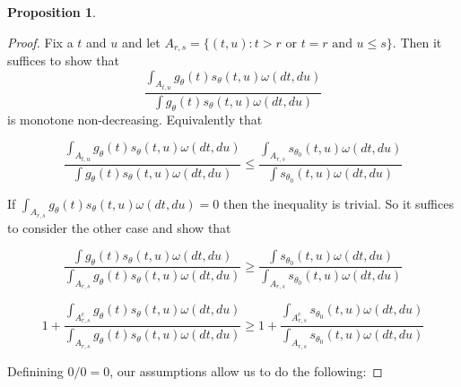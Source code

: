 \documentclass{article}
\newtheorem{proposition}{Proposition}
\begin{document}
\begin{appendix}
\begin{proposition}
\end{proposition}



\begin{proof}

        Fix a $t$ and $u$ and let $A_{r, s} = \{(t, u) : t > r \text{ or } t = r \text{ and } u \leq s \}$. Then it suffices to show that 
        \begin{equation*}
            \frac{ \int_{A_{t, u}}  g_{\theta}(t) s_{\theta}(t, u) \omega(dt, du)}{ \int g_{\theta}(t) s_{\theta}(t, u) \omega(dt, du)}
        \end{equation*}
        is monotone non-decreasing. Equivalently that  

        \begin{equation*}
            \frac{ \int_{A_{t, u}}  g_{\theta}(t) s_{\theta}(t, u) \omega(dt, du)}{ \int g_{\theta}(t) s_{\theta}(t, u) \omega(dt, du)} \leq \frac{ \int_{A_{r, s}} s_{\theta_0}(t, u) \omega(dt, du)}{ \int s_{\theta_0}(t, u) \omega(dt, du)}
        \end{equation*}

        If $\int_{A_{r, s}}  g_{\theta}(t) s_{\theta}(t, u) \omega(dt, du) = 0$ then the inequality is trivial. So it suffices to consider the other case and show that 

        \begin{equation*}
            \frac{ \int g_{\theta}(t) s_{\theta}(t, u) \omega(dt, du)} { \int_{A_{r, s}}  g_{\theta}(t) s_{\theta}(t, u) \omega(dt, du)} \geq \frac{ \int s_{\theta_0}(t, u) \omega(dt, du)}{ \int_{A_{r, s}} s_{\theta_0}(t, u) \omega(dt, du)}
        \end{equation*}

        \begin{equation*}
            1 + \frac{ \int_{A_{r, s}^c} g_{\theta}(t) s_{\theta}(t, u) \omega(dt, du)} { \int_{A_{r, s}}  g_{\theta}(t) s_{\theta}(t, u) \omega(dt, du)}\geq 1 + \frac{ \int_{A_{r, s}^c} s_{\theta_0}(t, u) \omega(dt, du)}{ \int_{A_{r, s}} s_{\theta_0}(t, u) \omega(dt, du)}
        \end{equation*}

        Definining $0/0 = 0$, our assumptions allow us to do the following:
        

\end{proof}
\end{appendix}
\end{document}
